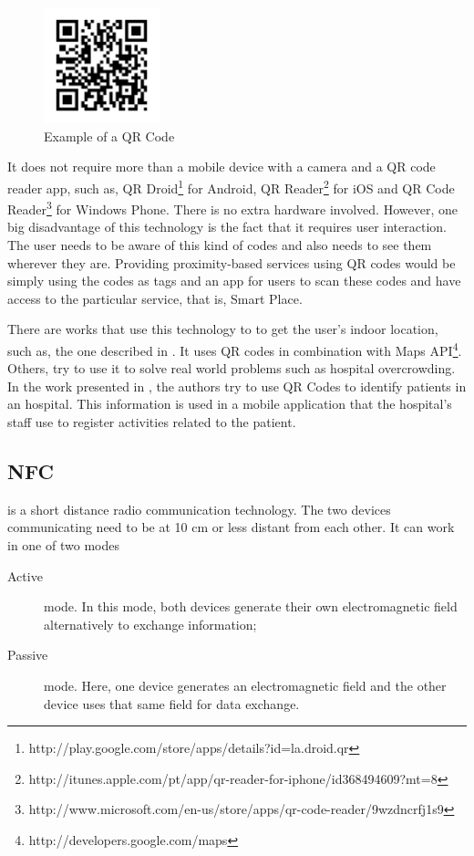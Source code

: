 \begin{figure}[!ht]
  \centering
    \includegraphics[width=0.3\textwidth, keepaspectratio]{images/qr_code}
    \caption{Example of a QR Code}
    \label{fig:qr_code}
\end{figure}

It does not require more than a mobile device with a camera and a \gls{QR} code reader app, such as, QR Droid\footnote{http://play.google.com/store/apps/details?id=la.droid.qr} for Android, QR Reader\footnote{http://itunes.apple.com/pt/app/qr-reader-for-iphone/id368494609?mt=8} for iOS and QR Code Reader\footnote{http://www.microsoft.com/en-us/store/apps/qr-code-reader/9wzdncrfj1s9} for Windows Phone.
There is no extra hardware involved.
However, one big disadvantage of this technology is the fact that it requires user interaction.
The user needs to be aware of this kind of codes and also needs to see them wherever they are.
Providing proximity-based services using \gls{QR} codes would be simply using the codes as tags and an app for users to scan these codes and have access to the particular service, that is, Smart Place.

There are works that use this technology to to get the user's indoor location, such as, the one described in \cite{qr_indoor}.
It uses \gls{QR} codes in combination with  Maps \gls{API}\footnote{http://developers.google.com/maps}.
Others, try to use it to solve real world problems such as hospital overcrowding.
In the work presented in \cite{qr_hospital}, the authors try to use \gls{QR} Codes to identify patients in an hospital.
This information is used in a mobile application that the hospital's staff use to register activities related to the patient.

\subsection{NFC}
\label{sub:background_near_field _communication}
\cite{nfc} is a short distance radio communication technology.
The two devices communicating need to be at 10 cm or less distant from each other.
It can work in one of two modes
\begin{description}
  \item[Active] mode. In this mode, both devices generate their own electromagnetic field alternatively to exchange information;
  \item[Passive] mode. Here, one device generates an electromagnetic field and the other device uses that same field for data exchange.
\end{description}

